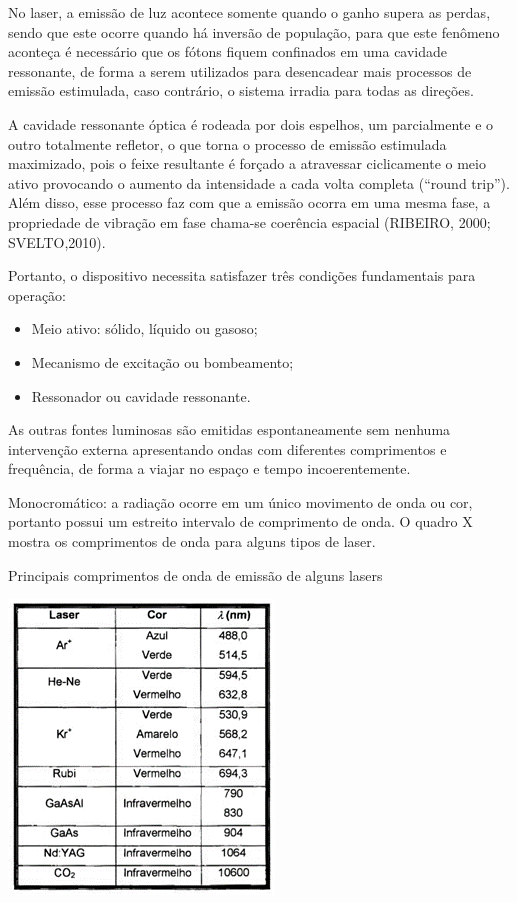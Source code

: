 \documentclass{fei}
\begin{document}
No laser, a emissão de luz acontece somente quando o ganho supera as perdas, sendo que este ocorre quando há inversão de população, para que este fenômeno aconteça é necessário que os fótons fiquem confinados em uma cavidade ressonante, de forma a serem utilizados para desencadear mais processos de emissão estimulada, caso contrário, o sistema irradia para todas as direções.

A cavidade ressonante óptica é rodeada por dois espelhos, um parcialmente e o outro totalmente refletor, o que torna o processo de emissão estimulada maximizado, pois o feixe resultante é forçado a atravessar ciclicamente o meio ativo provocando o aumento da intensidade a cada volta completa (“round trip”). Além disso, esse processo faz com que a emissão ocorra em uma mesma fase, a propriedade de vibração em fase chama-se coerência espacial (RIBEIRO, 2000; SVELTO,2010).

Portanto, o dispositivo necessita satisfazer três condições fundamentais para operação:

\begin{itemize}
	\item Meio ativo: sólido, líquido ou gasoso;
	\item Mecanismo de excitação ou bombeamento;
	\item Ressonador ou cavidade ressonante.
\end{itemize}

As outras fontes luminosas são emitidas espontaneamente sem nenhuma intervenção externa apresentando ondas com diferentes comprimentos e frequência, de forma a viajar no espaço e tempo incoerentemente.

Monocromático: a radiação ocorre em um único movimento de onda ou cor, portanto possui um estreito intervalo de comprimento de onda. O quadro X mostra os comprimentos de onda para alguns tipos de laser.

\begin{quadro}
\centering
\caption{Principais comprimentos de onda de emissão de alguns lasers}
\includegraphics{tabela_laser}
\end{quadro}
\end{document}
